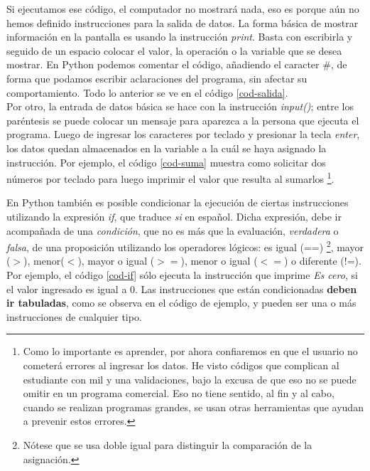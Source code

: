 \newpage



Si ejecutamos ese código, el computador no mostrará nada, eso es porque aún no hemos definido instrucciones para la salida de datos. La forma básica de mostrar información en la pantalla es usando la instrucción \emph{print}. Basta con escribirla y seguido de un espacio colocar el valor, la operación o la variable que se desea mostrar. En Python podemos comentar el código, añadiendo el caracter \#, de forma que podamos escribir aclaraciones del programa, sin afectar su comportamiento. Todo lo anterior se ve en el código \ref{cod-salida}. \\




Por otro, la entrada de datos básica se hace con la instrucción \emph{input()}; entre los paréntesis se puede colocar un mensaje para aparezca a la persona que ejecuta el programa. Luego de ingresar los caracteres por teclado y presionar la tecla \emph{enter}, los datos quedan almacenados en la variable a la cuál se haya asignado la instrucción. Por ejemplo, el código \ref{cod-suma} muestra como solicitar dos números por teclado para luego imprimir el valor que resulta al sumarlos \footnote{Como lo importante es aprender, por ahora confiaremos en que el usuario no cometerá errores al ingresar los datos. He visto códigos que complican al estudiante con mil y una validaciones, bajo la excusa de que eso no se puede omitir en un programa comercial. Eso no tiene sentido, al fin y al cabo, cuando se realizan programas grandes, se usan otras herramientas que ayudan a prevenir estos errores.}. \\

\newpage



En Python también es posible condicionar la ejecución de ciertas instrucciones utilizando la expresión \emph{if}, que traduce \emph{si} en español. Dicha expresión, debe ir acompañada de una \emph{condición}, que no es más que la evaluación, \emph{verdadera} o \emph{falsa}, de una proposición utilizando los operadores lógicos: es igual (==) \footnote{Nótese que se usa doble igual para distinguir la comparación de la asignación.}, mayor ($>$), menor($<$), mayor o igual ($>=$), menor o igual ($<=$) o diferente (!=). Por ejemplo, el código \ref{cod-if} sólo ejecuta la instrucción que imprime \emph{Es cero}, si  el valor ingresado es igual a 0. Las instrucciones que están condicionadas \textbf{deben ir tabuladas}, como se observa en el código de ejemplo, y pueden ser una o más instrucciones de cualquier tipo. \\

